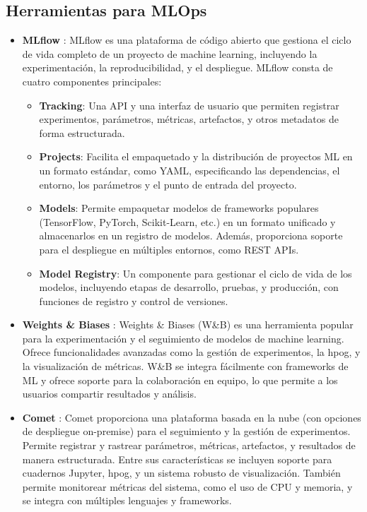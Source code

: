\subsection{Herramientas para MLOps}
\begin{itemize}
    \item \textbf{MLflow} \cite{mlflow} : MLflow es una plataforma de código abierto que gestiona el ciclo de vida completo de un proyecto de machine learning, incluyendo la experimentación, la reproducibilidad, y el despliegue. MLflow consta de cuatro componentes principales:
          \begin{itemize}
              \item \textbf{Tracking}: Una API y una interfaz de usuario que permiten registrar experimentos, parámetros, métricas, artefactos, y otros metadatos de forma estructurada.
              \item \textbf{Projects}: Facilita el empaquetado y la distribución de proyectos ML en un formato estándar, como YAML, especificando las dependencias, el entorno, los parámetros y el punto de entrada del proyecto.
              \item \textbf{Models}: Permite empaquetar modelos de frameworks populares (TensorFlow, PyTorch, Scikit-Learn, etc.) en un formato unificado y almacenarlos en un registro de modelos. Además, proporciona soporte para el despliegue en múltiples entornos, como REST APIs.
              \item \textbf{Model Registry}: Un componente para gestionar el ciclo de vida de los modelos, incluyendo etapas de desarrollo, pruebas, y producción, con funciones de registro y control de versiones.
          \end{itemize}
    \item \textbf{Weights \& Biases} \cite{weightsandbiases}: Weights \& Biases (W\&B) es una herramienta popular para la experimentación y el seguimiento de modelos de machine learning. Ofrece funcionalidades avanzadas como la gestión de experimentos, la \gls{hpog}, y la visualización de métricas. W\&B se integra fácilmente con frameworks de ML y ofrece soporte para la colaboración en equipo, lo que permite a los usuarios compartir resultados y análisis.

    \item \textbf{Comet} \cite{cometml}: Comet proporciona una plataforma basada en la nube (con opciones de despliegue on-premise) para el seguimiento y la gestión de experimentos. Permite registrar y rastrear parámetros, métricas, artefactos, y resultados de manera estructurada. Entre sus características se incluyen soporte para cuadernos Jupyter, \gls{hpog}, y un sistema robusto de visualización. También permite monitorear métricas del sistema, como el uso de CPU y memoria, y se integra con múltiples lenguajes y frameworks.


\end{itemize}
